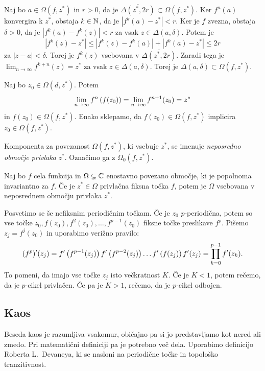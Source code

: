 \begin{dokaz}
    Naj bo \(a \in \Omega (f, z^*)\) in \(r > 0\), da je \(\overline{\Delta (z^*, 2r)} \subset \Omega (f, z^*)\). Ker \(f^n (a)\) konvergira k \(z^*\), obstaja \(k \in \mathbb N\), da je \(|f^k (a) - z^*| < r\). Ker je \(f\) zvezna, obstaja \(\delta > 0\), da je \(|f^k (a) - f^k (z)| < r\) za vsak \(z \in \Delta (a, \delta)\). Potem je
    \[|f^k (z) - z^*| \leq |f^k (z) - f^k (a)| + |f^k (a) - z^*| \leq 2r\]
    za \(|z - a| < \delta\). Torej je \(f^k (z)\) vsebovana v \(\overline{\Delta (z^*, 2r)}\). Zaradi tega je \(\lim_{n \to \infty} f^{k + n} (z) = z^*\) za vsak \(z \in \Delta (a, \delta)\). Torej je \(\Delta (a, \delta) \subset \Omega (f, z^*)\).

    Naj bo \(z_0 \in \Omega (d, z^*)\). Potem
    \[\lim_{n \to \infty} f^n \left( f (z_0) \right) = \lim_{n \to \infty} f^{n + 1} (z_0) = z^*\]
    in \(f (z_0) \in \Omega(f, z^*)\). Enako sklepamo, da \(f (z_0) \in \Omega (f, z^*)\) implicira \(z_0 \in \Omega (f, z^*)\).
\end{dokaz}

\noindent Komponenta za povezanost \(\Omega (f, z^*)\), ki vsebuje \(z^*\), se imenuje \emph{neposredno območje privlaka} \(z^*\). Označimo ga z \(\Omega_0 (f, z^*)\).

\begin{trditev} \label{prop:privlak}
    Naj bo \(f\) cela funkcija in \(\Omega \subsetneq \mathbb C\) enostavno povezano območje, ki je popolnoma invariantno za \(f\). Če je \(z^{*} \in \Omega\) privlačna fiksna točka \(f\), potem je \(\Omega\) vsebovana v neposrednem območju privlaka \(z^*\).
\end{trditev}

Posvetimo se še nefiksnim periodičnim točkam. Če je \(z_0\) \(p\)-periodična, potem so vse točke \(z_0, f (z_0), f^2 (z_0), \dots, f^{p - 1} (z_0)\) fiksne točke preslikave \(f^p\). Pišemo \(z_j = f^j (z_0)\) in uporabimo verižno pravilo:
\[(f^p)' (z_j) = f' \left( f^{p - 1} (z_j) \right) f' \left( f^{p - 2} (z_j) \right) \dots f' \left( f (z_j) \right) f' (z_j) = \prod_{k = 0}^{p - 1} f' (z_k).\]
To pomeni, da imajo vse točke \(z_j\) isto večkratnost \(K\). Če je \(K < 1\), potem rečemo, da je \(p\)-cikel privlačen. Če pa je \(K > 1\), rečemo, da je \(p\)-cikel odbojen.

\subsection{Kaos}

Beseda kaos je razumljiva vsakomur, običajno pa si jo predstavljamo kot nered ali zmedo. Pri matematični definiciji pa je potrebno več dela. Uporabimo definicijo Roberta L.~Devaneya, ki se nasloni na periodične točke in topološko tranzitivnost.

